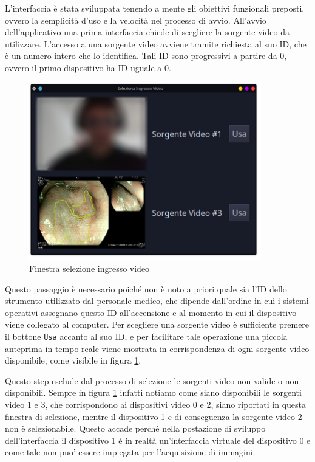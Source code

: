L'interfaccia è stata sviluppata tenendo a mente gli obiettivi
funzionali preposti, ovvero la semplicità d'uso e la velocità
nel processo di avvio.
All'avvio dell'applicativo una prima interfaccia chiede di
scegliere la sorgente video da utilizzare.
L'accesso a una sorgente video avviene tramite richiesta
al suo ID, che è un numero intero che lo identifica.
Tali ID sono progressivi a partire da 0, ovvero il primo
dispositivo ha ID uguale a 0.

\begin{figure}[H]
    \includegraphics[width=0.9\textwidth]{./assets/app-splashscreen.png}
    \caption{\label{fig:app-splashscreen} Finestra selezione ingresso video}
\end{figure}

Questo passaggio è necessario poiché non è noto a priori
quale sia l'ID dello strumento utilizzato dal personale medico,
che dipende dall'ordine in cui i sistemi operativi assegnano
questo ID all'accensione e al momento in cui il dispositivo
viene collegato al computer.
Per scegliere una sorgente video è sufficiente premere
il bottone {\tt Usa} accanto al suo ID, e per facilitare
tale operazione una piccola anteprima in tempo reale
viene mostrata in corrispondenza di ogni sorgente video
disponibile, come visibile in figura \ref{fig:app-splashscreen}.

Questo step esclude dal processo di selezione le sorgenti video
non valide o non disponibili.
Sempre in figura \ref{fig:app-splashscreen} infatti notiamo come
siano disponibili le sorgenti video 1 e 3, che corrispondono
ai dispositivi video 0 e 2, siano riportati in questa
finestra di selezione, mentre il dispositivo 1 e di conseguenza
la sorgente video 2 non è selezionabile.
Questo accade perché nella postazione di sviluppo dell'interfaccia
il dispositivo 1 è in realtà un'interfaccia virtuale del
dispositivo 0 e come tale non puo' essere impiegata per
l'acquisizione di immagini.

